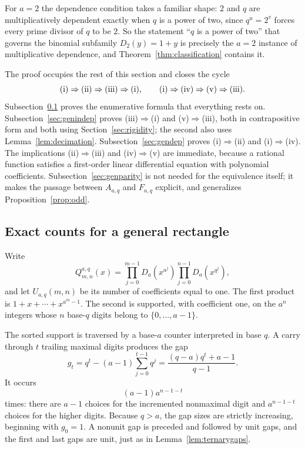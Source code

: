 \documentclass[11pt,letterpaper]{article}
\numberwithin{equation}{section}
\theoremstyle{definition}
\theoremstyle{remark}
\begin{document}
For $a=2$ the dependence condition takes a familiar shape: $2$ and $q$ are
multiplicatively dependent exactly when $q$ is a power of two, since
$q^u=2^v$ forces every prime divisor of $q$ to be $2$. So the statement
``$q$ is a power of two'' that governs the binomial subfamily
$D_2(y)=1+y$ is precisely the $a=2$ instance of multiplicative dependence,
and Theorem~\ref{thm:classification} contains it.

The proof occupies the rest of this section and closes the cycle
\[
 \hbox{(i)}\Rightarrow\hbox{(ii)}\Rightarrow\hbox{(iii)}
 \Rightarrow\hbox{(i)},
 \qquad
 \hbox{(i)}\Rightarrow\hbox{(iv)}\Rightarrow\hbox{(v)}
 \Rightarrow\hbox{(iii)}.
\]
Subsection~\ref{sec:genrect} proves the enumerative formula that everything
rests on. Subsection~\ref{sec:genindep} proves (iii)$\Rightarrow$(i) and
(v)$\Rightarrow$(iii), both in contrapositive form and both using
Section~\ref{sec:rigidity}; the second also uses
Lemma~\ref{lem:decimation}. Subsection~\ref{sec:gendep} proves
(i)$\Rightarrow$(ii) and (i)$\Rightarrow$(iv). The implications
(ii)$\Rightarrow$(iii) and (iv)$\Rightarrow$(v) are immediate, because a
rational function satisfies a first-order linear differential equation with
polynomial coefficients. Subsection~\ref{sec:genparity} is not needed for
the equivalence itself; it makes the passage between $A_{a,q}$ and
$F_{a,q}$ explicit, and generalizes Proposition~\ref{prop:odd}.

\subsection{Exact counts for a general rectangle}\label{sec:genrect}
Write
\begin{equation}\label{eq:generalrectangle}
 Q^{a,q}_{m,n}(x)=
 \prod_{j=0}^{m-1}D_a(x^{a^j})
 \prod_{j=0}^{n-1}D_a(x^{q^j}),
\end{equation}
and let $U_{a,q}(m,n)$ be its number of coefficients equal to one.
The first product is $1+x+\cdots+x^{a^m-1}$. The second is supported,
with coefficient one, on the $a^n$ integers whose $n$ base-$q$ digits
belong to $\{0,\ldots,a-1\}$.

The sorted support is traversed by a base-$a$ counter interpreted in base
$q$. A carry through $t$ trailing maximal digits produces the gap
\begin{equation}\label{eq:generalgap}
 g_t=q^t-(a-1)\sum_{j=0}^{t-1}q^j
     =\frac{(q-a)q^t+a-1}{q-1}.
\end{equation}
It occurs
\begin{equation}\label{eq:generalmultiplicity}
 (a-1)a^{n-1-t}
\end{equation}
times: there are $a-1$ choices for the incremented nonmaximal digit and
$a^{n-1-t}$ choices for the higher digits. Because $q>a$, the gap sizes
are strictly increasing, beginning with $g_0=1$. A nonunit gap is
preceded and followed by unit gaps, and the first and last gaps are
unit, just as in Lemma~\ref{lem:ternarygaps}.
\end{document}
